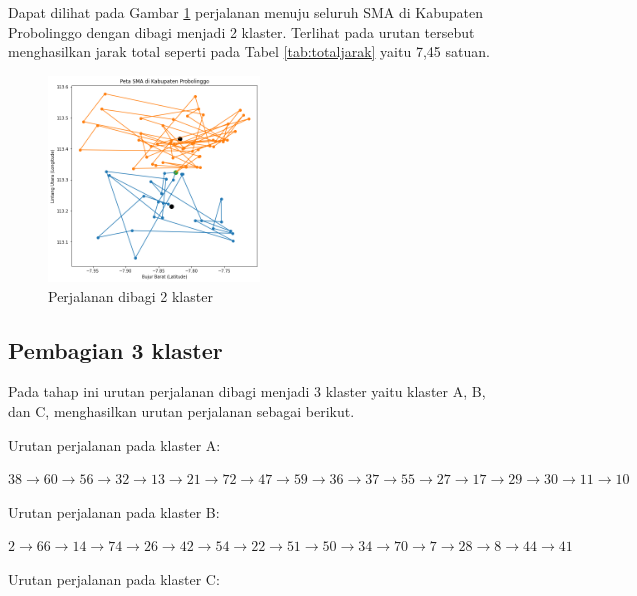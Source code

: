 Dapat dilihat pada Gambar \ref{fig:hasil_mtsp2} perjalanan menuju seluruh SMA di Kabupaten Probolinggo dengan dibagi menjadi 2 klaster. Terlihat pada urutan tersebut menghasilkan jarak total seperti pada Tabel \ref{tab:totaljarak} yaitu 7,45 satuan.

\begin{figure}[H]
\centering
\includegraphics[width=0.5\textwidth]{Gambar/hasil_mtsp/2}
\caption{Perjalanan dibagi 2 klaster}
\label{fig:hasil_mtsp2}
\end{figure}

\subsection{Pembagian 3 klaster}

Pada tahap ini urutan perjalanan dibagi menjadi 3 klaster yaitu klaster A, B, dan C, menghasilkan urutan perjalanan sebagai berikut.

\vspace{0.4cm}
\noindent Urutan perjalanan pada klaster A:

\noindent $
38 \rightarrow 60 \rightarrow 56 \rightarrow 32 \rightarrow 13 \rightarrow 21 \rightarrow 72 \rightarrow 47 \rightarrow 59 \rightarrow 36 \rightarrow 37 \rightarrow 55 \rightarrow 27 \rightarrow 17 \rightarrow 29 \rightarrow 30 \rightarrow 11 \rightarrow 10
$ 

\vspace{0.4cm}
\noindent Urutan perjalanan pada klaster B:

\noindent $
2 \rightarrow 66 \rightarrow 14 \rightarrow 74 \rightarrow 26 \rightarrow 42 \rightarrow 54 \rightarrow 22 \rightarrow 51 \rightarrow 50 \rightarrow 34 \rightarrow 70 \rightarrow 7 \rightarrow 28 \rightarrow 8 \rightarrow 44 \rightarrow 41
$

\vspace{0.4cm}
\noindent Urutan perjalanan pada klaster C:

